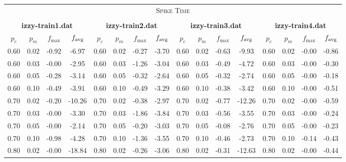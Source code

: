 { \scriptsize \setlength{\tabcolsep}{4pt} \renewcommand*\arraystretch{1.2} 
\begin{tabular}{c|c|c|c||c|c|c|c||c|c|c|c||c|c|c|c}

\multicolumn{16}{c}{ \normalsize \textsc{Spike Time}} \\ 
\multicolumn{16}{c}{ } \\
\multicolumn{4}{c}{ \textbf{izzy-train1.dat}} &    \multicolumn{4}{c}{ \textbf{izzy-train2.dat}} &    \multicolumn{4}{c}{ \textbf{izzy-train3.dat}} &    \multicolumn{4}{c}{ \textbf{izzy-train4.dat}} \\ \hline
$p_c$ & $p_m$ & $f_{\max}$ & $f_{\operatorname{avg}}$  &    $p_c$ & $p_m$ & $f_{\max}$ & $f_{\operatorname{avg}}$  &    $p_c$ & $p_m$ & $f_{\max}$ & $f_{\operatorname{avg}}$  &    $p_c$ & $p_m$ & $f_{\max}$ & $f_{\operatorname{avg}}$  \\ \hline\hline
0.60 & 0.02 & -0.92 & -6.97 &    0.60 & 0.02 & -0.27 & -3.70 &    0.60 & 0.02 & -0.63 & -9.93 &    0.60 & 0.02 & {\cellcolor{green}-0.00} & -0.86 \\ \hline
0.60 & 0.03 & {\cellcolor{green}-0.00} & -2.95 &    0.60 & 0.03 & -1.26 & -3.04 &    0.60 & 0.03 & -0.49 & -4.72 &    0.60 & 0.03 & {\cellcolor{green}-0.00} & -0.30 \\ \hline
0.60 & 0.05 & -0.28 & -3.14 &    0.60 & 0.05 & -0.32 & {\cellcolor{yellow}-2.64} &    0.60 & 0.05 & -0.32 & -2.74 &    0.60 & 0.05 & {\cellcolor{green}-0.00} & {\cellcolor{yellow}-0.18} \\ \hline
0.60 & 0.10 & -0.49 & -3.91 &    0.60 & 0.10 & -0.49 & -3.29 &    0.60 & 0.10 & -0.38 & -3.42 &    0.60 & 0.10 & {\cellcolor{green}-0.00} & -0.51 \\ \hline\hline
0.70 & 0.02 & -0.20 & -10.26 &    0.70 & 0.02 & -0.38 & -2.97 &    0.70 & 0.02 & -0.77 & -12.26 &    0.70 & 0.02 & {\cellcolor{green}-0.00} & -0.59 \\ \hline
0.70 & 0.03 & {\cellcolor{green}-0.00} & -3.30 &    0.70 & 0.03 & -1.86 & -3.84 &    0.70 & 0.03 & -0.56 & -3.55 &    0.70 & 0.03 & {\cellcolor{green}-0.00} & -0.24 \\ \hline
0.70 & 0.05 & {\cellcolor{green}-0.00} & {\cellcolor{yellow}-2.14} &    0.70 & 0.05 & {\cellcolor{green}-0.20} & -3.03 &    0.70 & 0.05 & {\cellcolor{green}-0.08} & -2.76 &    0.70 & 0.05 & {\cellcolor{green}-0.00} & -0.23 \\ \hline
0.70 & 0.10 & -0.98 & -4.28 &    0.70 & 0.10 & -1.36 & -3.55 &    0.70 & 0.10 & -0.46 & -2.73 &    0.70 & 0.10 & -0.14 & -0.43 \\ \hline\hline
0.80 & 0.02 & {\cellcolor{green}-0.00} & -18.84 &    0.80 & 0.02 & -0.26 & -3.06 &    0.80 & 0.02 & -0.31 & -12.63 &    0.80 & 0.02 & {\cellcolor{green}-0.00} & -0.44 \\ \hline

\end{tabular}}
